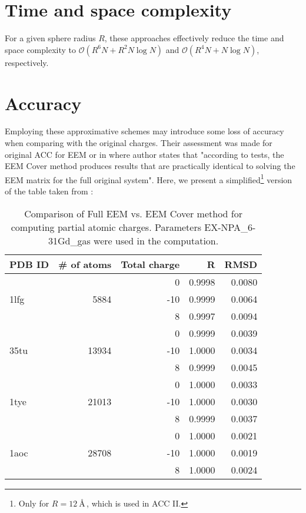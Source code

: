 \documentclass[oneside]{memoir}
\begin{document}
\section*{Time and space complexity}

For a given sphere radius $R$, these approaches effectively reduce the time and space complexity to ${\mathcal O}(R^6N + R^2N\log N)$ and ${\mathcal O}(R^4N + N\log N)$, respectively. \cite{Ionescu2015}

\section*{Accuracy}

Employing these approximative schemes may introduce some loss of accuracy when comparing with the original charges. Their assessment was made for original ACC for EEM \cite{Ionescu2015} or in \cite{Sehnal2015} where author states that "according to tests, the EEM Cover method produces results that are practically identical to solving the EEM matrix for the full original system". Here, we present a simplified\footnote{Only for $R = 12~$\AA\,, which is used in ACC II.} version of the table taken from \cite{Sehnal2015}:

\begin{table}[h]
\renewcommand{\thetable}{1}
\begin{center}
\begin{tabular}{lrrrr}
\toprule
\textbf{PDB ID} & \textbf{\# of atoms} & \textbf{Total charge} & \textbf{R} & \textbf{RMSD}\\
\midrule
\multirow{3}{*}{1lfg} & \multirow{3}{*}{5884}  &   0 & 0.9998 & 0.0080\\
                      &                        & -10 & 0.9999 & 0.0064\\
                      &                        &   8 & 0.9997 & 0.0094\\
\midrule
\multirow{3}{*}{35tu} & \multirow{3}{*}{13934} &   0 & 0.9999 & 0.0039\\
                      &                        & -10 & 1.0000 & 0.0034\\
                      &                        &   8 & 0.9999 & 0.0045\\
\midrule
\multirow{3}{*}{1tye} & \multirow{3}{*}{21013} &   0 & 1.0000 & 0.0033\\
                      &                        & -10 & 1.0000 & 0.0030\\
                      &                        &   8 & 0.9999 & 0.0037\\
\midrule
\multirow{3}{*}{1aoc} & \multirow{3}{*}{28708} &   0 & 1.0000 & 0.0021\\
                      &                        & -10 & 1.0000 & 0.0019\\
                      &                        &   8 & 1.0000 & 0.0024\\
\bottomrule
\end{tabular}
\caption{Comparison of Full EEM vs. EEM Cover method for computing partial atomic charges. Parameters EX-NPA\_6-31Gd\_gas \cite{Ionescu2013} were used in the computation.}
\end{center}
\end{table}
\end{document}
